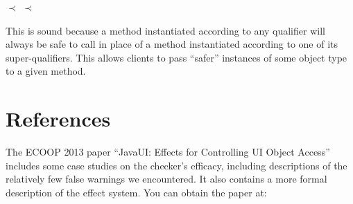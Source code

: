 \centerline{ $\prec$  $\prec$ }

\noindent
This is sound because a method instantiated according to any qualifier will always be
safe to call in place of a method instantiated according to one of its super-qualifiers.
This allows clients to pass ``safer'' instances of some object type to a given method.


\section{References\label{guieffects-references}}

The ECOOP 2013 paper ``JavaUI: Effects for Controlling UI Object Access''
    includes some case
    studies on the checker's efficacy, including descriptions of the relatively few false warnings
    we encountered.
    It also contains a more formal description of the effect system.
    You can obtain the paper at: \\


